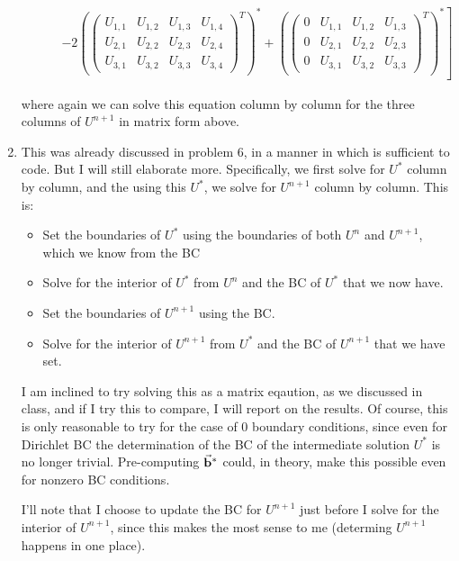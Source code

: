 \documentclass[11pt]{article}
\newcommand{\bvec}[1]{\vec{ {\bf #1 } }}
\begin{document}
\begin{enumerate}
\begin{align*}
& ~~~~~~~~~\left. -2\left ( \left ( \begin{array}{cccc} U_{1,1} & U_{1,2} & U_{1,3} & U_{1,4 }\\ U_{2,1} & U_{2,2} & U_{2,3} & U_{2,4 } \\ U_{3,1} & U_{3,2} & U_{3,3} & U_{3,4 }  \end{array} \right ) ^T \right ) ^{*} + \left ( \left ( \begin{array}{cccc} 0 & U_{1,1} & U_{1,2} & U_{1,3 }\\ 0 & U_{2,1} & U_{2,2} & U_{2,3 } \\ 0 & U_{3,1} & U_{3,2} & U_{3,3 }  \end{array} \right ) ^T \right ) ^{*} \right ]\end{align*}

where again we can solve this equation column by column for the three columns of $U^{n+1}$ in matrix form above.

\item This was already discussed in problem 6, in a manner in which is sufficient to code.
But I will still elaborate more.
Specifically, we first solve for $U ^*$ column by column, and the using this $U^*$, we solve for $U ^{n+1}$ column by column.
This is:
\begin{itemize}
\item Set the boundaries of $U^*$ using the boundaries of both $U^{n}$ and $U^{n+1}$, which we know from the BC
\item Solve for the interior of $U^*$ from $U^{n}$ and the BC of $U^*$ that we now have.
\item Set the boundaries of $U^{n+1}$ using the BC.
\item Solve for the interior of $U^{n+1}$ from $U^{*}$ and the BC of $U^{n+1}$ that we have set.
\end{itemize} 

I am inclined to try solving this as a matrix eqaution, as we discussed in class, and if I try this to compare, I will report on the results.
Of course, this is only reasonable to try for the case of 0 boundary conditions, since even for Dirichlet BC the determination of the BC of the intermediate solution $U^*$ is no longer trivial.
Pre-computing $\bvec{b}^*$ could, in theory, make this possible even for nonzero BC conditions.

I'll note that I choose to update the BC for $U^{n+1}$ just before I solve for the interior of $U^{n+1}$, since this makes the most sense to me (determing $U^{n+1}$ happens in one place).


\end{enumerate}
\end{document}
